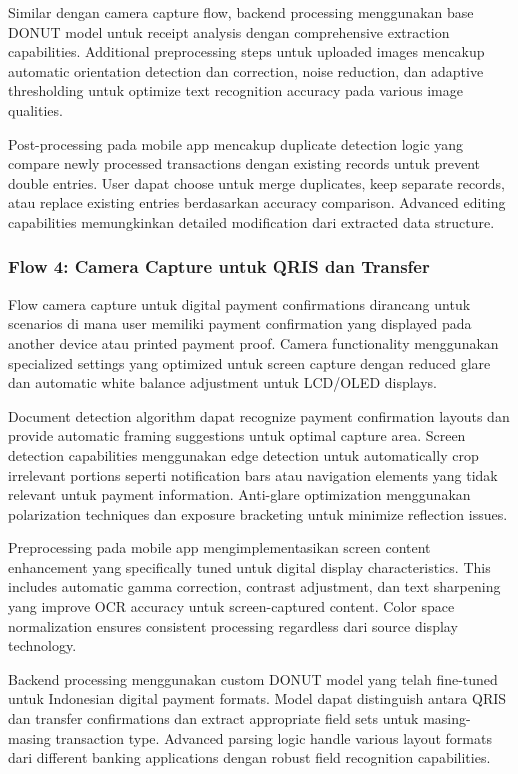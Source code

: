 Similar dengan camera capture flow, backend processing menggunakan base DONUT model untuk receipt analysis dengan comprehensive extraction capabilities. Additional preprocessing steps untuk uploaded images mencakup automatic orientation detection dan correction, noise reduction, dan adaptive thresholding untuk optimize text recognition accuracy pada various image qualities.

Post-processing pada mobile app mencakup duplicate detection logic yang compare newly processed transactions dengan existing records untuk prevent double entries. User dapat choose untuk merge duplicates, keep separate records, atau replace existing entries berdasarkan accuracy comparison. Advanced editing capabilities memungkinkan detailed modification dari extracted data structure.

\subsubsection{Flow 4: Camera Capture untuk QRIS dan Transfer}
\label{subsubsec:flow-camera-digital}

Flow camera capture untuk digital payment confirmations dirancang untuk scenarios di mana user memiliki payment confirmation yang displayed pada another device atau printed payment proof. Camera functionality menggunakan specialized settings yang optimized untuk screen capture dengan reduced glare dan automatic white balance adjustment untuk LCD/OLED displays.

Document detection algorithm dapat recognize payment confirmation layouts dan provide automatic framing suggestions untuk optimal capture area. Screen detection capabilities menggunakan edge detection untuk automatically crop irrelevant portions seperti notification bars atau navigation elements yang tidak relevant untuk payment information. Anti-glare optimization menggunakan polarization techniques dan exposure bracketing untuk minimize reflection issues.

Preprocessing pada mobile app mengimplementasikan screen content enhancement yang specifically tuned untuk digital display characteristics. This includes automatic gamma correction, contrast adjustment, dan text sharpening yang improve OCR accuracy untuk screen-captured content. Color space normalization ensures consistent processing regardless dari source display technology.

Backend processing menggunakan custom DONUT model yang telah fine-tuned untuk Indonesian digital payment formats. Model dapat distinguish antara QRIS dan transfer confirmations dan extract appropriate field sets untuk masing-masing transaction type. Advanced parsing logic handle various layout formats dari different banking applications dengan robust field recognition capabilities.

